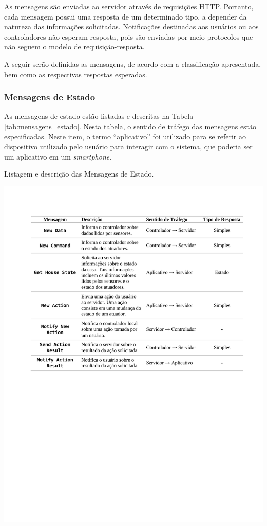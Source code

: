 As mensagens são enviadas ao servidor através de requisições HTTP. Portanto, cada mensagem possui uma resposta de um determinado tipo, a depender da natureza das informações solicitadas.  Notificações destinadas aos usuários ou aos controladores não esperam resposta, pois são enviadas por meio protocolos que não seguem o modelo de requisição-resposta. 

A seguir serão definidas as mensagens, de acordo com a classificação apresentada, bem como as respectivas respostas esperadas. 

\subsubsection{Mensagens de Estado}
As mensagens de estado estão listadas e descritas na Tabela \ref{tab:mensagens_estado}. Nesta tabela, o sentido de tráfego das mensagens estão especificadas. Neste item, o termo ``aplicativo'' foi utilizado para se referir ao dispositivo utilizado pelo usuário para interagir com o sistema, que poderia ser um aplicativo em um \textit{smartphone}.

\begin{table}[h]
	\centering
	\caption{Listagem e descrição das Mensagens de Estado.}\smallskip
	\label{tab:mensagens_estado}
	\includegraphics[width=\textwidth]{tabelas/mensagens_estado.pdf}
\end{table}

